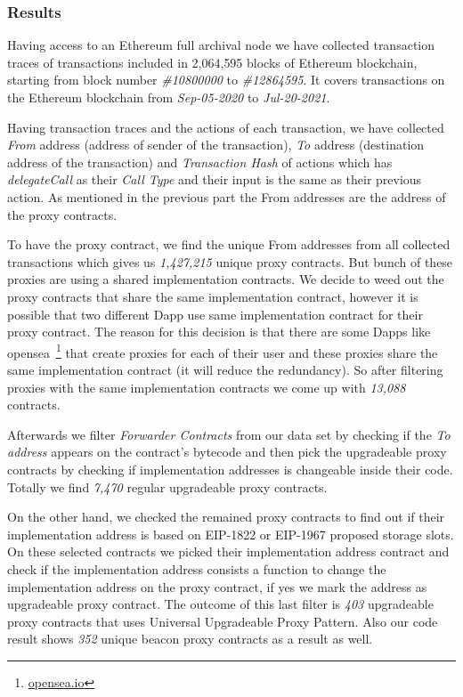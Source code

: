 \subsubsection{Results}

Having access to an Ethereum full archival node we have collected transaction traces of transactions included in 2,064,595 blocks of Ethereum blockchain, starting from block number \textit{\#10800000} to \textit{\#12864595}. It covers transactions on the Ethereum blockchain from \textit{Sep-05-2020} to \textit{Jul-20-2021}. 

Having transaction traces and the actions of each transaction, we have collected \textit{From} address (address of sender of the transaction), \textit{To} address (destination address of the transaction) and \textit{Transaction Hash} of actions which has \textit{delegateCall} as their \textit{Call Type} and their input is the same as their previous action. As mentioned in the previous part the From addresses are the address of the proxy contracts.

To have the proxy contract, we find the unique From addresses from all collected transactions which gives us \textit{1,427,215} unique proxy contracts. But bunch of these proxies are using a shared implementation contracts. We decide to weed out the proxy contracts that share the same implementation contract, however it is possible that two different Dapp use same implementation contract for their proxy contract. The reason for this decision is that there are some Dapps like opensea~\footnote{\url{opensea.io}} that create proxies for each of their user and these proxies share the same implementation contract (it will reduce the redundancy). So after filtering proxies with the same implementation contracts we come up with \textit{13,088} contracts.

Afterwards we filter \textit{Forwarder Contracts} from our data set by checking if the \textit{To address} appears on the contract's bytecode and then pick the upgradeable proxy contracts by checking if implementation addresses is changeable inside their code. Totally we find \textit{7,470} regular upgradeable proxy contracts. 

On the other hand, we checked the remained proxy contracts to find out if their implementation address is based on EIP-1822 or EIP-1967 proposed storage slots. On these selected contracts we picked their implementation address contract and check if the implementation address consists a function to change the implementation address on the proxy contract, if yes we mark the address as upgradeable proxy contract. The outcome of this last filter is \textit{403} upgradeable proxy contracts that uses Universal Upgradeable Proxy Pattern. Also our code result shows \textit{352} unique beacon proxy contracts as a result as well.

